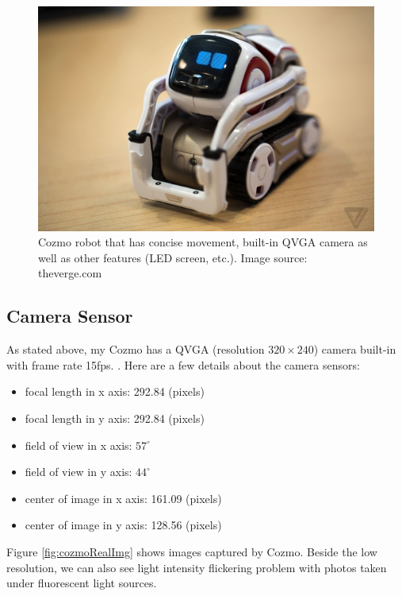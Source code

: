 \begin{figure}[!htb]
	\centering
	\includegraphics[width=0.8\hsize]{./figures/cozmo}
	\caption{Cozmo robot that has concise movement, built-in QVGA camera as well as other features (LED screen, etc.). Image source: theverge.com}
	\label{fig:cozmo}
\end{figure}

\subsection{Camera Sensor}
\label{subsec:camInfo}
 As stated above, my Cozmo has a QVGA (resolution $320 \times 240$) camera built-in with frame rate 15fps. . Here are a few details about the camera sensors:
 \begin{itemize}
 	\item focal length in x axis: 292.84 (pixels)
 	\item focal length in y axis: 292.84 (pixels)
 	\item field of view in x axis: $57^{\circ}$
 	\item field of view in y axis: $44^{\circ}$
 	\item center of image in x axis: 161.09 (pixels)
 	\item center of image in y axis: 128.56 (pixels)
 \end{itemize}
Figure \ref{fig:cozmoRealImg} shows images captured by Cozmo. Beside the low resolution, we can also see light intensity flickering problem with photos taken under fluorescent light sources.

